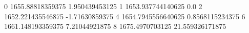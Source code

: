 0 1655.88818359375 1.950439453125
1 1653.937744140625 0.0
2 1652.221435546875 -1.71630859375
4 1654.7945556640625 0.8568115234375
6 1661.148193359375 7.21044921875
8 1675.4970703125 21.559326171875
